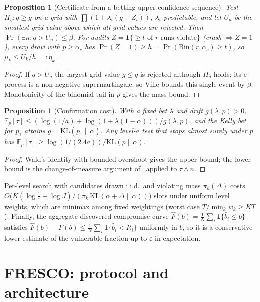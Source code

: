 \documentclass[11pt]{article}
\newtheorem{proposition}[theorem]{Proposition}
\theoremstyle{definition}
\theoremstyle{remark}
\newcommand{\E}{\mathbb{E}}
\newcommand{\Prob}{\Pr}
\newcommand{\bhat}{\hat b}
\begin{document}
\begin{proposition}[Certificate from a betting upper confidence sequence]\label{prop:cs}
Test $H_g:q\ge g$ on a grid with $\prod(1+\lambda_i(g-Z_i))$, $\lambda_i$ predictable, and let $U_n$ be the smallest grid value above which all grid values are rejected. Then $\Prob(\exists n:q>U_n)\le\beta$. For audits $Z=\mathbf 1\{\ge t\text{ of }r\text{ runs violate}\}$ (crash $\Rightarrow Z=1$), every draw with $p\ge\alpha_c$ has $\Prob(Z=1)\ge h=\Prob(\mathrm{Bin}(r,\alpha_c)\ge t)$, so $\mu_k\le U_k/h=:\bar\eta_k$.
\end{proposition}
\begin{proof}
If $q>U_n$ the largest grid value $g\le q$ is rejected although $H_g$ holds; its e-process is a non-negative supermartingale, so Ville bounds this single event by $\beta$. Monotonicity of the binomial tail in $p$ gives the mass bound.
\end{proof}

\begin{proposition}[Confirmation cost]\label{prop:cost}
With a fixed bet $\lambda$ and drift $g(\lambda,p)>0$, $\E_p[\tau]\le(\log(1/a)+\log(1+\lambda(1-\alpha)))/g(\lambda,p)$, and the Kelly bet for $p_1$ attains $g=\mathrm{KL}(p_1\|\alpha)$. Any level-$a$ test that stops almost surely under $p$ has $\E_p[\tau]\ge\log(1/(2.4a))/\mathrm{KL}(p\|\alpha)$.
\end{proposition}
\begin{proof}
Wald's identity with bounded overshoot gives the upper bound; the lower bound is the change-of-measure argument of~\cite{kaufmann2016} applied to $\tau\wedge n$.
\end{proof}

Per-level search with candidates drawn i.i.d.\ and violating mass $\pi_k(\Delta)$ costs $O\bigl(K(\log\frac1\varepsilon+\log J)/(\pi_k\,\mathrm{KL}(\alpha{+}\Delta\|\alpha))\bigr)$ slots under uniform level weights, which are minimax among fixed weightings (worst case $T/\min_kw_k\ge KT$). Finally, the aggregate discovered-compromise curve $\hat F(b)=\frac1N\sum_i\mathbf 1\{\bhat_i\le b\}$ satisfies $\hat F(b)-F(b)\le\frac1N\sum_i\mathbf 1\{\bhat_i<R_i\}$ uniformly in $b$, so it is a conservative lower estimate of the vulnerable fraction up to $\varepsilon$ in expectation.

\section{FRESCO: protocol and architecture}\label{sec:fresco}
\end{document}
